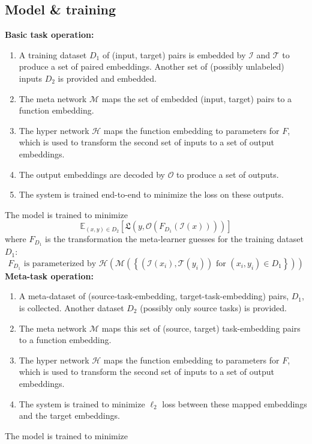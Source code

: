 \subsection{Model \& training} \label{app_model_details}
\textbf{Basic task operation:}
\begin{enumerate}
\item A training dataset $D_1$ of (input, target) pairs is embedded by $\mathcal{I}$ and $\mathcal{T}$ to produce a set of paired embeddings. Another set of (possibly unlabeled) inputs $D_2$ is provided and embedded.
\item The meta network $\mathcal{M}$ maps the set of embedded (input, target) pairs to a function embedding.
\item The hyper network $\mathcal{H}$ maps the function embedding to parameters for $F$, which is used to transform the second set of inputs to a set of output embeddings.
\item The output embeddings are decoded by $\mathcal{O}$ to produce a set of outputs.
\item The system is trained end-to-end to minimize the loss on these outputs.
\end{enumerate}
The model is trained to minimize 
\[\mathbb{E}_{(x, y)\in {D}_2} \left[ \mathfrak{L}\left(y, \mathcal{O}\left(F_{D_1}\left(\mathcal{I} \left(x\right)\right) \right)\right)\right]\]
where $F_{D_1}$ is the transformation the meta-learner guesses for the training dataset $D_1$:
\[F_{D_1} \text{ is parameterized by } \mathcal{H}\left(\mathcal{M}\left( \left\{\left(\mathcal{I}\left(x_i\right), \mathcal{T}\left(y_i\right) \right) \text{ for } (x_i, y_i) \in D_1 \right\}\right)\right)\]
\textbf{Meta-task operation:}
\begin{enumerate}
\item A meta-dataset of (source-task-embedding, target-task-embedding) pairs, $D_1$, is collected. Another dataset $D_2$ (possibly only source tasks) is provided.
\item The meta network $\mathcal{M}$ maps this set of (source, target) task-embedding pairs to a function embedding.
\item The hyper network $\mathcal{H}$ maps the function embedding to parameters for $F$, which is used to transform the second set of inputs to a set of output embeddings.
\item The system is trained to minimize $\ell_2$ loss between these mapped embeddings and the target embeddings. 
\end{enumerate}
The model is trained to minimize
